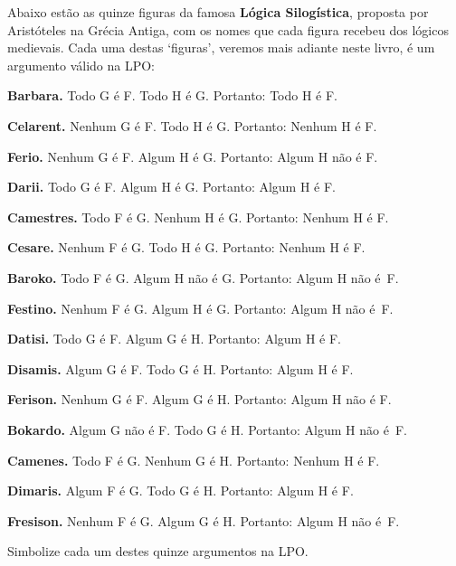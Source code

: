 \practiceproblems
\problempart
\label{pr.BarbaraEtc}
Abaixo estão as quinze figuras da famosa \textbf{Lógica Silogística}, proposta por Aristóteles na Grécia Antiga, com os nomes que cada figura recebeu dos lógicos medievais.
Cada uma destas `figuras', veremos mais adiante neste livro, é um argumento válido na LPO:
\begin{earg}\small 
	\item \textbf{Barbara.} Todo G é F. Todo H é G. Portanto:  Todo H é F.
	\item \textbf{Celarent.} Nenhum G é F. Todo H é G. Portanto: Nenhum H é F.
	\item \textbf{Ferio.} Nenhum G é F. Algum H é G. Portanto: Algum H não é F.
	\item \textbf{Darii.} Todo G é F. Algum H é G. Portanto: Algum H é F.
	\item \textbf{Camestres.} Todo F é G. Nenhum H é G. Portanto: Nenhum H é F.
	\item \textbf{Cesare.} Nenhum F é G. Todo H é G. Portanto: Nenhum H é F.
	\item \textbf{Baroko.} Todo F é G. Algum H não é G. Portanto: Algum H não é~F.
	\item \textbf{Festino.} Nenhum F é G. Algum H é G. Portanto: Algum H não é~F.
	\item \textbf{Datisi.} Todo G é F. Algum G é H. Portanto: Algum H é F.
	\item \textbf{Disamis.} Algum G é F. Todo G é H. Portanto: Algum H é F.
	\item \textbf{Ferison.} Nenhum G é F. Algum G é H. Portanto: Algum H não é F.
	\item \textbf{Bokardo.} Algum G não é F. Todo G é H. Portanto:  Algum H não é~F.
	\item \textbf{Camenes.} Todo F é G. Nenhum G é H. Portanto: Nenhum H é F.
	\item \textbf{Dimaris.} Algum F é G. Todo G é H. Portanto: Algum H é F.
	\item \textbf{Fresison.} Nenhum F é G. Algum G é H. Portanto: Algum H não é~F.
\end{earg}
Simbolize cada um destes quinze argumentos na LPO.

\

